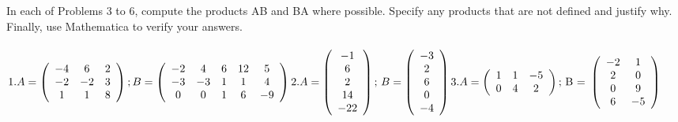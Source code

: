 \documentclass[12pt]{article}
\newenvironment{problem}[2][Problem]{\begin{trivlist}
\item[\hskip \labelsep {\bfseries #1}\hskip \labelsep {\bfseries #2.}]}{\end{trivlist}}
\begin{document}
\begin{problem}{III}
In each of Problems 3 to 6, compute the products AB and BA where possible. Specify any products that are not defined and justify why. Finally, use Mathematica to verify your answers. \\ \\
$1. A = \left(
\begin{array}{ccc}
 -4 & 6 & 2 \\
 -2 & -2 & 3 \\
 1 & 1 & 8 \\
\end{array}
\right); B = \left(
\begin{array}{ccccc}
 -2 & 4 & 6 & 12 & 5 \\
 -3 & -3 & 1 & 1 & 4 \\
 0 & 0 & 1 & 6 & -9 \\
\end{array}
\right)\\ \\ \\
2. A=\left(
\begin{array}{c}
 -1 \\
 6 \\
 2 \\
 14 \\
 -22 \\
\end{array}
\right)\text{; } B=\left(
\begin{array}{c}
 -3 \\
 2 \\
 6 \\
 0 \\
 -4 \\
\end{array}
\right)\\ \\ \\
3. A= \left(
\begin{array}{ccc}
 1 & 1 & -5 \\
 0 & 4 & 2 \\
\end{array}
\right) \text{; B = }\left(
\begin{array}{cc}
 -2 & 1 \\
 2 & 0 \\
 0 & 9 \\
 6 & -5 \\
\end{array}
\right)$
\end{problem}
\end{document}
